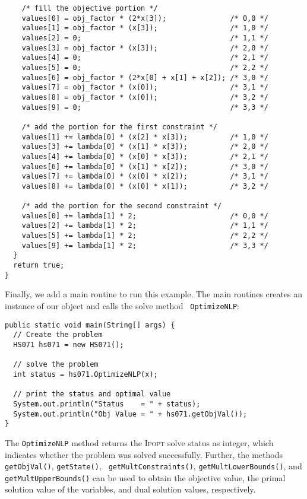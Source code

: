 \documentclass[10pt]{article}
\newcommand{\Ipopt}{\textsc{Ipopt}\xspace}
\begin{document}
\begin{verbatim}
    /* fill the objective portion */
    values[0] = obj_factor * (2*x[3]);               /* 0,0 */
    values[1] = obj_factor * (x[3]);                 /* 1,0 */
    values[2] = 0;                                   /* 1,1 */
    values[3] = obj_factor * (x[3]);                 /* 2,0 */
    values[4] = 0;                                   /* 2,1 */
    values[5] = 0;                                   /* 2,2 */
    values[6] = obj_factor * (2*x[0] + x[1] + x[2]); /* 3,0 */
    values[7] = obj_factor * (x[0]);                 /* 3,1 */
    values[8] = obj_factor * (x[0]);                 /* 3,2 */
    values[9] = 0;                                   /* 3,3 */

    /* add the portion for the first constraint */
    values[1] += lambda[0] * (x[2] * x[3]);          /* 1,0 */
    values[3] += lambda[0] * (x[1] * x[3]);          /* 2,0 */
    values[4] += lambda[0] * (x[0] * x[3]);          /* 2,1 */
    values[6] += lambda[0] * (x[1] * x[2]);          /* 3,0 */
    values[7] += lambda[0] * (x[0] * x[2]);          /* 3,1 */
    values[8] += lambda[0] * (x[0] * x[1]);          /* 3,2 */

    /* add the portion for the second constraint */
    values[0] += lambda[1] * 2;                      /* 0,0 */
    values[2] += lambda[1] * 2;                      /* 1,1 */
    values[5] += lambda[1] * 2;                      /* 2,2 */
    values[9] += lambda[1] * 2;                      /* 3,3 */
  }
  return true;
}
\end{verbatim}

\noindent Finally, we add a main routine to run this example. The main 
routines creates an instance of our object and calls the solve method {\tt 
OptimizeNLP}:
\begin{verbatim}
public static void main(String[] args) {
  // Create the problem
  HS071 hs071 = new HS071();

  // solve the problem
  int status = hs071.OptimizeNLP(x);
  
  // print the status and optimal value
  System.out.println("Status    = " + status);
  System.out.println("Obj Value = " + hs071.getObjVal());
}
\end{verbatim}
The {\tt OptimizeNLP} method returns the \Ipopt solve status as integer, which 
indicates whether the problem was solved successfully.
Further, the methods {\tt getObjVal()}, {\tt getState()}, {\tt 
getMultConstraints()}, {\tt getMultLowerBounds()}, and {\tt 
getMultUpperBounds()} can be used to obtain the objective value, the primal 
solution value of the variables, and dual solution values, respectively.
\end{document}
